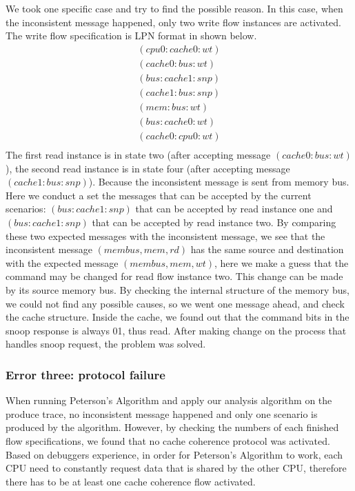 \documentclass[12pt,frontmatter,copyright,thesis]{usfmanus}
\begin{document}
We took one specific case and try to find the possible reason.
In this case, when the inconsistent message happened, only two write flow instances
are activated. The write flow specification is LPN format in shown below.
\[
\begin{array}{l}
(cpu0: cache0: wt)\\
(cache0: bus: wt)\\
(bus: cache1: snp)\\
(cache1: bus: snp)\\
(mem: bus: wt)\\
(bus: cache0: wt)\\
(cache0: cpu0: wt)\\
\end{array}
\]
The first read instance is in state two (after accepting message $(cache0: bus: wt)$),
the second read instance is in state four (after accepting message $(cache1: bus: snp)$).
Because the inconsistent message is sent from memory bus. Here we conduct a set
the messages that can be accepted by the current scenarios: $(bus: cache1: snp)$ that can be accepted
by read instance one and $(bus: cache1: snp)$ that can be accepted by
read instance two. By comparing these two expected messages with
the inconsistent message, we see that the inconsistent message
$(membus, mem, rd)$ has the same source and destination with
the expected message $(membus, mem, wt)$, here we make
a guess that
the command may be changed for read flow instance two. This change
can be made by its source memory bus. By checking the internal structure
of the memory bus, we could not find any possible causes, so we went one
message ahead, and check the cache structure. Inside the cache,
we found out that the command bits in the snoop response
is always 01, thus read. After making change on the
process that handles snoop request, the problem was solved.


\subsubsection{Error three: protocol failure}


When running Peterson's Algorithm and apply our analysis algorithm on
the produce trace, no inconsistent message happened and only one scenario is produced
by the algorithm.
However, by checking the numbers of each finished flow specifications,
we found that no cache coherence protocol was activated. Based on debuggers experience, in order for Peterson's Algorithm to work, each CPU
need to constantly request data that is shared by the other CPU,
therefore there has to be at least one cache 
coherence flow activated.
\end{document}
